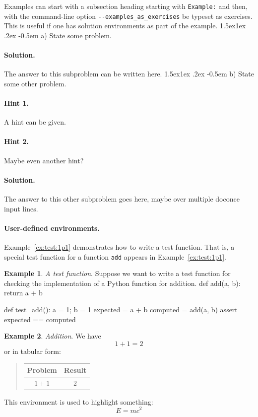 \documentclass[%
oneside,                 %
final,                   %
10pt]{article}
\makeatletter
\newenvironment{doconceexercise}{}{}
\newcommand\subex{\@startsection{paragraph}{4}{\z@}%
                  {1.5ex\@plus1ex \@minus.2ex}%
                  {-0.5em}%
                  {\normalfont\normalsize\bfseries}}
\theoremstyle{definition}
\newtheorem{example}{Example}[section]
\makeatother
\begin{document}
\begin{enumerate}
\begin{doconceexercise}
\label{Example}
Examples can start with a subsection heading starting with \texttt{Example:}
and then, with the command-line option \Verb!--examples_as_exercises! be
typeset as exercises. This is useful if one has solution
environments as part of the example.
\subex{a)}
State some problem.
\paragraph{Solution.}
The answer to this subproblem can be written here.
\subex{b)}
State some other problem.
\paragraph{Hint 1.}
A hint can be given.
\paragraph{Hint 2.}
Maybe even another hint?
\paragraph{Solution.}
The answer to this other subproblem goes here,
maybe over multiple doconce input lines.
\end{doconceexercise}
\paragraph{User-defined environments.}
Example~\vref{ex:test:1p1} demonstrates how to write a test function.
That is, a special test function for a function \texttt{add} appears in
Example~\vref{ex:test:1p1}.
\begin{example}
\label{ex:test:1p1}
\noindent\emph{A test function}.
Suppose we want to write a test function for checking the
implementation of a Python function for addition.
\bpycod
def add(a, b):
    return a + b

def test_add():
    a = 1; b = 1
    expected = a + b
    computed = add(a, b)
    assert expected == computed

\epycod

\end{example}
\begin{example}
\label{ex:math:1p1}
\noindent\emph{Addition}.
We have
\[ 1 + 1 = 2 \]
or in tabular form:
\begin{quote}
\begin{tabular}{cc}
\hline
\multicolumn{1}{c}{ Problem } & \multicolumn{1}{c}{ Result } \\
\hline
$1+1$   & $2$    \\
\hline
\end{tabular}
\end{quote}
\noindent
\end{example}
\begin{tcolorbox}[%
boxrule=1mm,
coltitle=black,
colframe=blue!45!white,
colback=blue!15!white,
width=(.9\linewidth),before=\hfill,after=\hfill,
adjusted title={Highlight box!}]
This environment is used to highlight something:
\[ E = mc^2 \]
\end{tcolorbox}

\end{enumerate}
\end{document}

